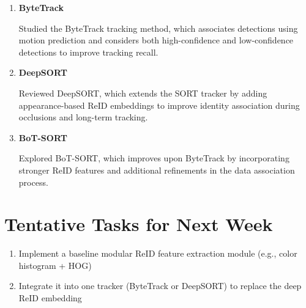 \documentclass[11pt,a4paper]{article}
\begin{document}
	\begin{enumerate}[leftmargin=*]		
		\item \textbf{ByteTrack}
		
		Studied the ByteTrack tracking method, which associates detections using motion prediction and considers both 
		high-confidence and low-confidence detections to improve tracking recall.
		
		\item \textbf{DeepSORT}
		
		Reviewed DeepSORT, which extends the SORT tracker by adding appearance-based ReID embeddings to improve identity 
		association during occlusions and long-term tracking.
		
		\item \textbf{BoT-SORT}

		Explored BoT-SORT, which improves upon ByteTrack by incorporating stronger ReID features and additional refinements 
		in the data association process.
	\end{enumerate}
	
	\section*{Tentative Tasks for Next Week}
	\begin{enumerate}
		\item Implement a baseline modular ReID feature extraction module (e.g., color histogram + HOG) 
		\item Integrate it into one tracker (ByteTrack or DeepSORT) to replace the deep ReID embedding
	\end{enumerate}
	
\end{document}
